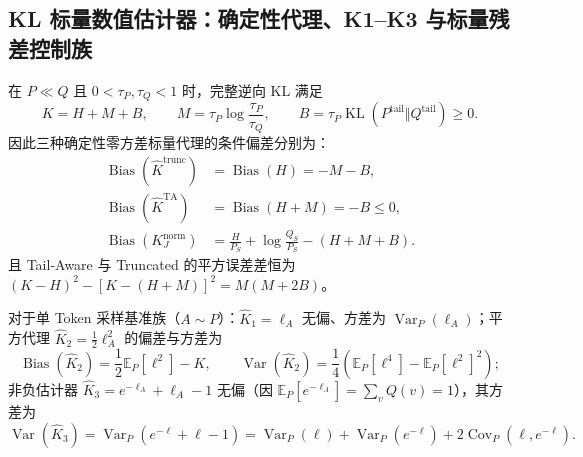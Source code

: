 \documentclass[lang=cn,scheme=chinese,openany]{elegantbook}
\newcommand{\E}{\mathbb E}
\newcommand{\KL}{\operatorname{KL}}
\newcommand{\Var}{\operatorname{Var}}
\newcommand{\tail}{\mathrm{tail}}
\begin{document}
\subsection{KL 标量数值估计器：确定性代理、K1--K3 与标量残差控制族}

\begin{corollary}
\label{est:thm:chapter3-kl-chain}
\label{est:prop:chapter3-ta-scalar}
在 $P\ll Q$ 且 $0<\tau_P,\tau_Q<1$ 时，完整逆向 KL 满足
\begin{equation}
 K=H+M+B,\qquad
 M=\tau_P\log\frac{\tau_P}{\tau_Q},\qquad
 B=\tau_P\KL(P^{\tail}\Vert Q^{\tail})\geq0.
\label{est:eq:chapter3-kl-chain}
\end{equation}
因此三种确定性零方差标量代理的条件偏差分别为：
\begin{align}
 \operatorname{Bias}(\widehat K^{\mathrm{trunc}})&=\operatorname{Bias}(H)=-M-B,
 \label{est:eq:chapter3-trunc-bias-var}\\
 \operatorname{Bias}(\widehat K^{\mathrm{TA}})&=\operatorname{Bias}(H+M)=-B\le 0,\\
 \operatorname{Bias}(K^{\mathrm{norm}}_J)&=\frac{H}{P_S}+\log\frac{Q_S}{P_S}-(H+M+B).
 \label{est:eq:chapter3-normalized-bias}
\end{align}
且 Tail-Aware 与 Truncated 的平方误差差恒为 $(K-H)^2-[K-(H+M)]^2=M(M+2B)$。
\end{corollary}

对于单 Token 采样基准族（$A\sim P$）：$\widehat K_1=\ell_A$ 无偏、方差为 $\Var_P(\ell_A)$；平方代理 $\widehat K_2=\frac12\ell_A^2$ 的偏差与方差为
\begin{equation}
 \operatorname{Bias}(\widehat K_2)=\frac12\E_P[\ell^2]-K,
 \qquad
 \Var(\widehat K_2)=\frac14\left(\E_P[\ell^4]-\E_P[\ell^2]^2\right);
 \label{est:eq:chapter3-k2-bias-var}
\end{equation}
非负估计器 $\widehat K_3=e^{-\ell_A}+\ell_A-1$ 无偏（因 $\E_P[e^{-\ell_A}]=\sum_v Q(v)=1$），其方差为
\begin{equation}
 \Var(\widehat K_3)=\Var_P(e^{-\ell}+\ell-1)
 =\Var_P(\ell)+\Var_P(e^{-\ell})+2\operatorname{Cov}_P(\ell,e^{-\ell}).
 \label{est:eq:chapter3-k3-var}
\end{equation}
\end{document}
